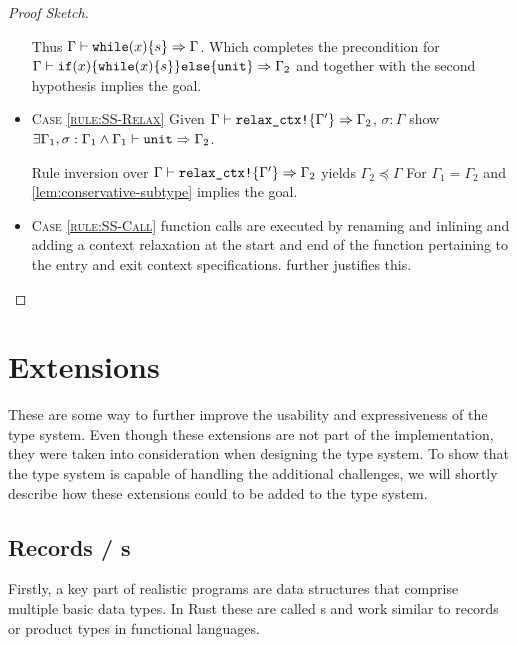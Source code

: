 \documentclass[twoside, english]{sdqthesis}
\theoremstyle{definition}
\begin{document}
\begin{proof}[Proof Sketch]
\begin{itemize}
    Thus $\Gamma \vdash \code{while}(x) \{s\} \Rightarrow \Gamma$.
    Which completes the precondition for \\$\Gamma \vdash \code{if}(x) \{\code{while}(x) \{s\}\}\code{else}\{\code{unit}\} \Rightarrow \Gamma_2$ and together with the second hypothesis implies the goal.
  \item \textsc{Case \cref{rule:SS-Relax}} 
    Given $\Gamma \vdash \code{relax\_ctx!}\{\Gamma'\} \Rightarrow \Gamma_2$, $\sigma : \Gamma$ 
    show $ \exists \Gamma_1, \sigma : \Gamma_1 \wedge \Gamma_1 \vdash \code{unit} \Rightarrow \Gamma_2$.

    Rule inversion over $\Gamma \vdash \code{relax\_ctx!}\{\Gamma'\} \Rightarrow \Gamma_2$ yields $\Gamma_2 \preceq \Gamma$
    For $\Gamma_1 = \Gamma_2$ and \cref{lem:conservative-subtype} implies the goal.
  \item \textsc{Case \cref{rule:SS-Call}} function calls are executed by renaming and inlining and adding a context relaxation at the start and end of the function pertaining to the entry and exit context specifications.  further justifies this.
\end{itemize}
\end{proof}

\fi
\section{Extensions}\label{sec:extensions}

These are some way to further improve the usability and expressiveness of the type system.
Even though these extensions are not part of the implementation, they were taken into consideration when designing the type system. To show that the type system is capable of handling the additional challenges, we will shortly describe how these extensions could to be added to the type system.

\subsection{Records / s}

Firstly, a key part of realistic programs are data structures that comprise multiple basic data types. In Rust these are called s and work similar to records or product types in functional languages. 
\end{document}
